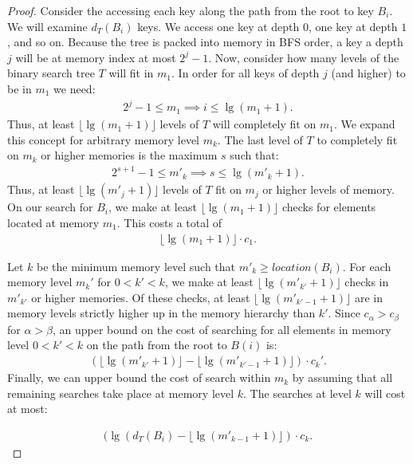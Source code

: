 \documentclass[letterpaper,12pt,titlepage,oneside,final]{book}
\theoremstyle{plain}
\begin{document}
\begin{proof}
Consider the accessing each key along the path from the root to key $B_i$. We will examine $d_T(B_i)$ keys. We access one key at depth $0$, one key at depth $1$, and so on. Because the tree is packed into memory in BFS order, a key a depth $j$ will be at memory index at most $2^j-1$. Now, consider how many levels of the binary search tree $T$ will fit in $m_1$. In order for all keys of depth $j$ (and higher) to be in $m_1$ we need:
\begin{align*}
2^j-1 \leq m_1 \implies i \leq \lg(m_1 + 1).
\end{align*}
Thus, at least $\lfloor \lg(m_1 + 1) \rfloor$ levels of $T$ will completely fit on $m_1$. We expand this concept for arbitrary memory level $m_k$. The last level of $T$ to completely fit on $m_k$ or higher memories is the maximum $s$ such that:
\begin{align*}
2^{s+1}-1 \leq m'_k \implies s \leq \lg(m'_k + 1).
\end{align*}
Thus, at least $\lfloor \lg(m'_j + 1) \rfloor$ levels of $T$ fit on $m_j$ or higher levels of memory.
On our search for $B_i$, we make at least $\lfloor \lg(m_1 + 1) \rfloor$ checks for elements located at memory $m_1$. This costs a total of
\begin{align*}
\lfloor \lg(m_1 + 1) \rfloor \cdot c_1.
\end{align*}

Let $k$ be the minimum memory level such that $m'_k \geq location(B_i)$. For each memory level $m_k'$ for $0 < k' < k$, we make at least $\lfloor \lg(m'_{k'} + 1) \rfloor$ checks in $m'_{k'}$ or higher memories. Of these checks, at least $\lfloor \lg(m'_{k'-1} + 1) \rfloor$ are in memory levels strictly higher up in the memory hierarchy than $k'$. Since $c_\alpha > c_\beta$ for $\alpha > \beta$, an upper bound on the cost of searching for all elements in memory level $0 < k' < k$ on the path from the root to $B(i)$ is:
\begin{align*}
(\lfloor \lg(m'_{k'} + 1) \rfloor - \lfloor \lg(m'_{k'-1} + 1) \rfloor) \cdot c_k'.
\end{align*}
Finally, we can upper bound the cost of search within $m_k$ by assuming that all remaining searches take place at memory level $k$. The searches at level $k$ will cost at most:

\begin{align*}
(\lg(d_T(B_i) - \lfloor \lg(m'_{k-1}+1) \rfloor)\cdot c_k.
\end{align*}


\end{proof}
\end{document}
